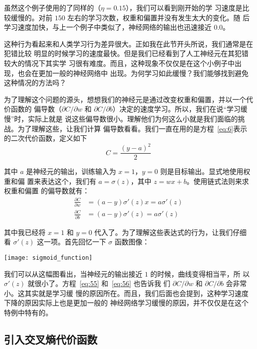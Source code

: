 虽然这个例子使用的了同样的\learningrate{}（$\eta=0.15$），我们可以看到刚开始的学
习速度是比较缓慢的。对前 $150$ 左右的学习次数，权重和偏置并没有发生太大的变化。随
后学习速度加快，与上一个例子中类似了，神经网络的输出也迅速接近 $0.0$。

这种行为看起来和人类学习行为差异很大。正如我在此节开头所说，我们通常是在犯错比较
明显的时候学习的速度最快。但是我们已经看到了人工神经元在其犯错较大的情况下其实学
习很有难度。而且，这种现象不仅仅是在这个小例子中出现，也会在更加一般的神经网络中
出现。为何学习如此缓慢？我们能够找到避免这种情况的方法吗？

为了理解这个问题的源头，想想我们的神经元是通过改变权重和偏置，并以一个代价函数的
偏导数（$\partial C/\partial w$ 和
$\partial C/\partial b$）决定的速度学习。所以，我们在说“学习缓慢”时，实际上就是
说这些偏导数很小。理解他们为何这么小就是我们面临的挑战。为了理解这些，让我们计算
偏导数看看。我们一直在用的是方程~\eqref{eq:6}表示的二次代价函数，定义如下
\begin{equation}
  C = \frac{(y-a)^2}{2}
\label{eq:54}\tag{54}
\end{equation}

其中 $a$ 是神经元的输出，训练输入为 $x=1$，$y=0$ 则是目标输出。显式地使用权重和偏
置来表达这个，我们有 $a = \sigma(z)$，其中 $z = wx+b$。使用链式法则来求权重和偏置
的偏导数就有：
\begin{align}
  \frac{\partial C}{\partial w} &= (a-y)\sigma'(z) x = a \sigma'(z)\label{eq:55}\tag{55}\\
  \frac{\partial C}{\partial b} &= (a-y)\sigma'(z) = a \sigma'(z)\label{eq:56}\tag{56}
\end{align}

其中我已经将 $x = 1$ 和 $y = 0$ 代入了。为了理解这些表达式的行为，让我们仔细
看 $\sigma'(z)$ 这一项。首先回忆一下 $\sigma$ 函数图像：
\begin{center}
  \texttt{[image: sigmoid\_function]}
\end{center}

我们可以从这幅图看出，当神经元的输出接近 $1$ 的时候，曲线变得相当平，所
以 $\sigma'(z)$ 就很小了。方程~\eqref{eq:55} 和~\eqref{eq:56} 也告诉我
们 $\partial C/\partial w$ 和 $\partial C/\partial b$ 会非常小。这其实就是学习缓
慢的原因所在。而且，我们后面也会提到，这种学习速度下降的原因实际上也是更加一般的
神经网络学习缓慢的原因，并不仅仅是在这个特例中特有的。

\subsection{引入交叉熵代价函数}
\label{sec:introducing_the_cross-entropy_cost_function}

